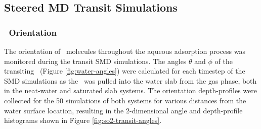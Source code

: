 \subsection{Steered MD Transit Simulations}

\subsubsection {\suldiox~Orientation}

	The orientation of \suldiox~molecules throughout the aqueous adsorption process was monitored during the transit SMD simulations. The angles $\theta$ and $\phi$ of the transiting \suldiox~(Figure \ref{fig:water-angles}) were calculated for each timestep of the SMD simulations as the \suldiox~was pulled into the water slab from the gas phase, both in the neat-water and saturated slab systems. The orientation depth-profiles were collected for the 50 simulations of both systems for various distances from the water surface location, resulting in the 2-dimensional angle and depth-profile histograms shown in Figure \ref{fig:so2-transit-angles}.

